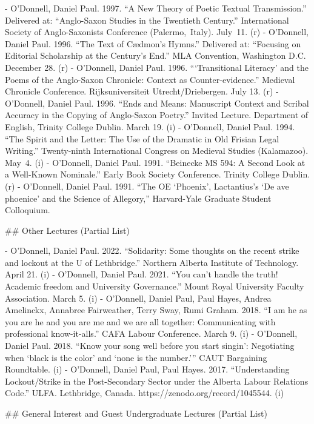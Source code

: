 - O'Donnell, Daniel Paul. 1997. “A New Theory of Poetic Textual Transmission.” Delivered at: “Anglo-Saxon Studies in the Twentieth Century.” International Society of Anglo-Saxonists Conference (Palermo, Italy). July 11. (r)
- O'Donnell, Daniel Paul. 1996. “The Text of Cædmon’s Hymns.” Delivered at: “Focusing on Editorial Scholarship at the Century’s End.” MLA Convention, Washington D.C. December 28. (r)
- O'Donnell, Daniel Paul. 1996. “‘Transitional Literacy’ and the Poems of the Anglo-Saxon Chronicle: Context as Counter-evidence.” Medieval Chronicle Conference. Rijksuniversiteit Utrecht/\allowbreak{}Driebergen. July 13. (r)
- O'Donnell, Daniel Paul. 1996. “Ends and Means: Manuscript Context and Scribal Accuracy in the Copying of Anglo-Saxon Poetry.” Invited Lecture. Department of English, Trinity College Dublin. March 19. (i)
- O'Donnell\*, Daniel Paul. 1994. “The Spirit and the Letter: The Use of the Dramatic in Old Frisian Legal Writing.” Twenty-ninth International Congress on Medieval Studies (Kalamazoo). May 4. (i)
- O'Donnell\*, Daniel Paul. 1991. “Beinecke MS 594: A Second Look at a Well-Known Nominale.” Early Book Society Conference. Trinity College Dublin. (r)
- O'Donnell\*, Daniel Paul. 1991. “The OE ‘Phoenix’, Lactantius’s ‘De ave phoenice’ and the Science of Allegory,” Harvard-Yale Graduate Student Colloquium.

\sectionbreak{}
## Other Lectures (Partial List)

- O’Donnell, Daniel Paul. 2022. “Solidarity: Some thoughts on the recent strike and lockout at the U of Lethbridge.” Northern Alberta Institute of Technology. April 21. (i)
- O’Donnell, Daniel Paul. 2021. “You can’t handle the truth! Academic freedom and University Governance.” Mount Royal University Faculty Association. March 5. (i)
- O’Donnell, Daniel Paul, Paul Hayes, Andrea Amelinckx, Annabree Fairweather, Terry Sway, Rumi Graham. 2018. “I am he as you are he and you are me and we are all together: Communicating with professional know-it-alls.” CAFA Labour Conference. March 9. (i)
- O'Donnell, Daniel Paul. 2018. “Know your song well before you start singin’: Negotiating when ‘black is the color’ and ‘none is the number.’” CAUT Bargaining Roundtable. (i)
- O'Donnell, Daniel Paul, Paul Hayes. 2017. “Understanding Lockout/\allowbreak{}Strike in the Post-Secondary Sector under the Alberta Labour Relations Code.” ULFA. Lethbridge, Canada. https:/\allowbreak{}/\allowbreak{}zenodo.org/\allowbreak{}record/\allowbreak{}1045544. (i)

\sectionbreak{}
## General Interest and Guest Undergraduate Lectures (Partial List)

